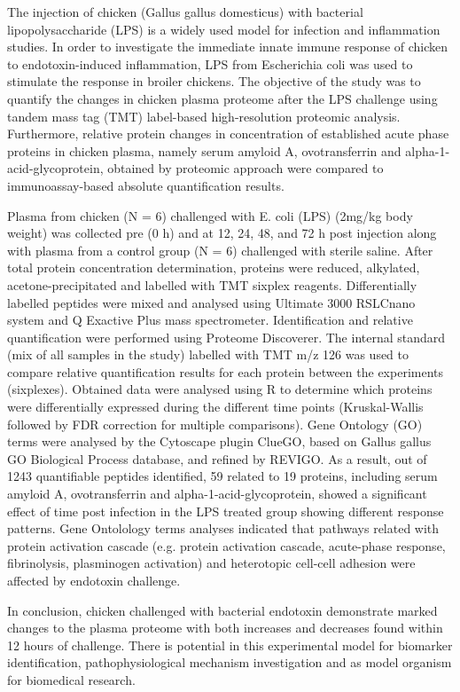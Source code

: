 {The injection of chicken (Gallus gallus domesticus) with bacterial lipopolysaccharide (LPS) is a widely used model for infection and inflammation studies. In order to investigate the immediate innate immune response of chicken to endotoxin-induced inflammation, LPS from Escherichia coli was used to stimulate the response in broiler chickens. The objective of the study was to quantify the changes in chicken plasma proteome after the LPS challenge using tandem mass tag (TMT) label-based high-resolution proteomic analysis. Furthermore, relative protein changes in concentration of established acute phase proteins in chicken plasma, namely serum amyloid A, ovotransferrin and alpha-1-acid-glycoprotein, obtained by proteomic approach were compared to immunoassay-based absolute quantification results.

Plasma from chicken (N = 6) challenged with E. coli (LPS) (2mg/kg body weight) was collected pre (0 h) and at 12, 24, 48, and 72 h post injection along with plasma from a control group (N = 6) challenged with sterile saline. After total protein concentration determination, proteins were reduced, alkylated, acetone-precipitated and labelled with TMT sixplex reagents. Differentially labelled peptides were mixed and analysed using Ultimate 3000 RSLCnano system and Q Exactive Plus mass spectrometer. Identification and relative quantification were performed using Proteome Discoverer. The internal standard (mix of all samples in the study) labelled with TMT m/z 126 was used to compare relative quantification results for each protein between the experiments (sixplexes). Obtained data were analysed using R to determine which proteins were differentially expressed during the different time points (Kruskal-Wallis followed by FDR correction for multiple comparisons). Gene Ontology (GO) terms were analysed by the Cytoscape plugin ClueGO, based on Gallus gallus GO Biological Process database, and refined by REVIGO. As a result, out of 1243 quantifiable peptides identified, 59 related to 19 proteins, including serum amyloid A, ovotransferrin and alpha-1-acid-glycoprotein, showed a significant effect of time post infection in the LPS treated group showing different response patterns. Gene Ontolology terms analyses indicated that pathways related with protein activation cascade (e.g. protein activation cascade, acute-phase response, fibrinolysis, plasminogen activation) and heterotopic cell-cell adhesion were affected by endotoxin challenge.

In conclusion, chicken challenged with bacterial endotoxin demonstrate marked changes to the plasma proteome with both increases and decreases found within 12 hours of challenge. There is potential in this experimental model for biomarker identification, pathophysiological mechanism investigation and as model organism for biomedical research.


}
